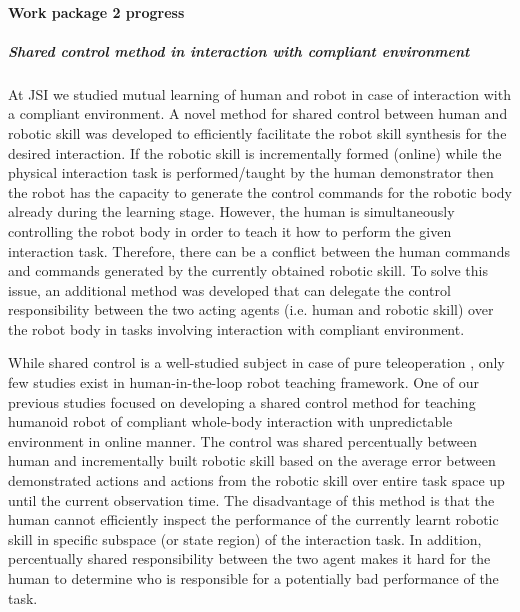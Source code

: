 \paragraph{Work package 2 progress}

\subparagraph{Shared control method in interaction with compliant environment}

At JSI we studied mutual learning of human and robot in case of interaction with a compliant environment. A novel method for shared control between human and robotic skill was developed to efficiently facilitate the robot skill synthesis for the desired interaction. If the robotic skill is incrementally formed (online) while the physical interaction task is performed/taught by the human demonstrator then the robot has the capacity to generate the control commands for the robotic body already during the learning stage. However, the human is simultaneously controlling the robot body in order to teach it how to perform the given interaction task. Therefore, there can be a conflict between the human commands and commands generated by the currently obtained robotic skill. To solve this issue, an additional method was developed that can delegate the control responsibility between the two acting agents (i.e. human and robotic skill) over the robot body in tasks involving interaction with compliant environment.

While shared control is a well-studied subject in case of pure teleoperation \cite{Niemeyer2008}, only few studies exist in human-in-the-loop robot teaching framework. One of our previous studies \cite{Peternel2013} focused on developing a shared control method for teaching humanoid robot of compliant whole-body interaction with unpredictable environment in online manner. The control was shared percentually between human and incrementally built robotic skill based on the average error between demonstrated actions and actions from the robotic skill over entire task space up until the current observation time. The disadvantage of this method is that the human cannot efficiently inspect the performance of the currently learnt robotic skill in specific subspace (or state region) of the interaction task. In addition, percentually shared responsibility between the two agent makes it hard for the human to determine who is responsible for a potentially bad performance of the task.

